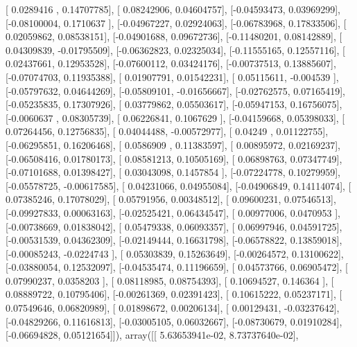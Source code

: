 \documentclass{article}
\begin{document}
       [ 0.0289416 ,  0.14707785],
       [ 0.08242906,  0.04604757],
       [-0.04593473,  0.03969299],
       [-0.08100004,  0.1710637 ],
       [-0.04967227,  0.02924063],
       [-0.06783968,  0.17833506],
       [ 0.02059862,  0.08538151],
       [-0.04901688,  0.09672736],
       [-0.11480201,  0.08142889],
       [ 0.04309839, -0.01795509],
       [-0.06362823,  0.02325034],
       [-0.11555165,  0.12557116],
       [ 0.02437661,  0.12953528],
       [-0.07600112,  0.03424176],
       [-0.00737513,  0.13885607],
       [-0.07074703,  0.11935388],
       [ 0.01907791,  0.01542231],
       [ 0.05115611, -0.004539  ],
       [-0.05797632,  0.04644269],
       [-0.05809101, -0.01656667],
       [-0.02762575,  0.07165419],
       [-0.05235835,  0.17307926],
       [ 0.03779862,  0.05503617],
       [-0.05947153,  0.16756075],
       [-0.0060637 ,  0.08305739],
       [ 0.06226841,  0.1067629 ],
       [-0.04159668,  0.05398033],
       [ 0.07264456,  0.12756835],
       [ 0.04044488, -0.00572977],
       [ 0.04249   ,  0.01122755],
       [-0.06295851,  0.16206468],
       [ 0.0586909 ,  0.11383597],
       [ 0.00895972,  0.02169237],
       [-0.06508416,  0.01780173],
       [ 0.08581213,  0.10505169],
       [ 0.06898763,  0.07347749],
       [-0.07101688,  0.01398427],
       [ 0.03043098,  0.1457854 ],
       [-0.07224778,  0.10279959],
       [-0.05578725, -0.00617585],
       [ 0.04231066,  0.04955084],
       [-0.04906849,  0.14114074],
       [ 0.07385246,  0.17078029],
       [ 0.05791956,  0.00348512],
       [ 0.09600231,  0.07546513],
       [-0.09927833,  0.00063163],
       [-0.02525421,  0.06434547],
       [ 0.00977006,  0.0470953 ],
       [-0.00738669,  0.01838042],
       [ 0.05479338,  0.06093357],
       [ 0.06997946,  0.04591725],
       [-0.00531539,  0.04362309],
       [-0.02149444,  0.16631798],
       [-0.06578822,  0.13859018],
       [-0.00085243, -0.0224743 ],
       [ 0.05303839,  0.15263649],
       [-0.00264572,  0.13100622],
       [-0.03880054,  0.12532097],
       [-0.04535474,  0.11196659],
       [ 0.04573766,  0.06905472],
       [ 0.07990237,  0.0358203 ],
       [ 0.08118985,  0.08754393],
       [ 0.10694527,  0.146364  ],
       [ 0.08889722,  0.10795406],
       [-0.00261369,  0.02391423],
       [ 0.10615222,  0.05237171],
       [ 0.07549646,  0.06820989],
       [ 0.01898672,  0.00206134],
       [ 0.00129431, -0.03237642],
       [-0.04829266,  0.11616813],
       [-0.03005105,  0.06032667],
       [-0.08730679,  0.01910284],
       [-0.06694828,  0.05121654]]), array([[  5.63653941e-02,   8.73737640e-02],
\end{document}
